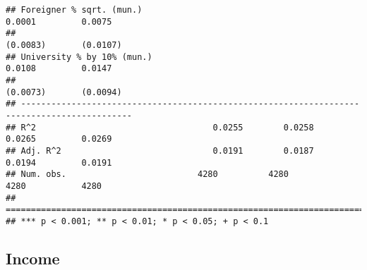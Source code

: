 \documentclass[
]{article}
\begin{document}
\begin{verbatim}
## Foreigner % sqrt. (mun.)                                           0.0001         0.0075    
##                                                                   (0.0083)       (0.0107)   
## University % by 10% (mun.)                                         0.0108         0.0147    
##                                                                   (0.0073)       (0.0094)   
## --------------------------------------------------------------------------------------------
## R^2                                   0.0255        0.0258         0.0265         0.0269    
## Adj. R^2                              0.0191        0.0187         0.0194         0.0191    
## Num. obs.                          4280          4280           4280           4280         
## ============================================================================================
## *** p < 0.001; ** p < 0.01; * p < 0.05; + p < 0.1
\end{verbatim}

\hypertarget{income-5}{%
\subsection{Income}\label{income-5}}
\end{document}

